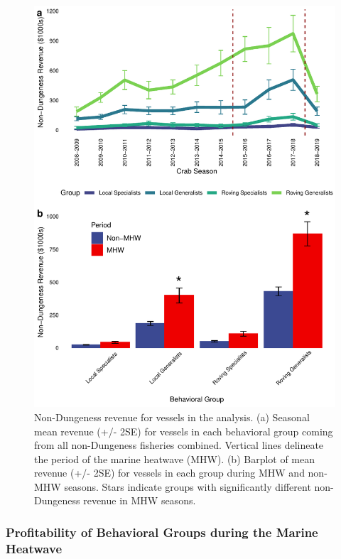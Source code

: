 \documentclass[9pt,twocolumn,twoside,lineno]{pnas-new}
\begin{document}
\begin{figure}%
\includegraphics[width=\linewidth]{fig_nondcrb_revenue.pdf}
\caption{Non-Dungeness revenue for vessels in the analysis. (a) Seasonal mean revenue (+/- 2SE) for vessels in each behavioral group coming from all non-Dungeness fisheries combined. Vertical lines delineate the period of the marine heatwave (MHW). (b) Barplot of mean revenue (+/- 2SE) for vessels in each group during MHW and non-MHW seasons. Stars indicate groups with significantly different non-Dungeness revenue in MHW seasons.}
\label{fig:revenue}
\end{figure}

\hypertarget{profitability-of-behavioral-groups-during-the-marine-heatwave}{%
\subsubsection*{Profitability of Behavioral Groups during the Marine
Heatwave}\label{profitability-of-behavioral-groups-during-the-marine-heatwave}}
\end{document}
